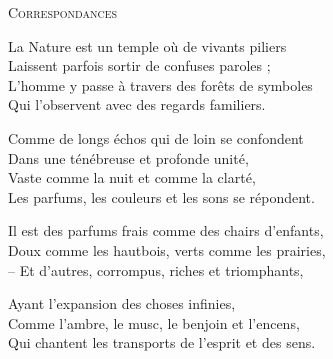\begin{fquote}
\vspace{-1em}
\begin{center}
\hspace{-.0\linewidth}\textsc{Correspondances}
\end{center}

\hspace{.12\linewidth}La Nature est un temple où de vivants piliers \\[-1.5em]

\hspace{.12\linewidth}Laissent parfois sortir de confuses paroles ;\\[-1.5em]

\hspace{.12\linewidth}L'homme y passe à travers des forêts de symboles \\[-1.5em]

\hspace{.12\linewidth}Qui l'observent avec des regards familiers. \bigskip

\hspace{.12\linewidth}Comme de longs échos qui de loin se confondent \\[-1.5em]

\hspace{.12\linewidth}Dans une ténébreuse et profonde unité, \\[-1.5em]

\hspace{.12\linewidth}Vaste comme la nuit et comme la clarté,\\[-1.5em]

\hspace{.12\linewidth}Les parfums, les couleurs et les sons se répondent. \bigskip

\hspace{.12\linewidth}Il est des parfums frais comme des chairs d'enfants, \\[-1.5em]

\hspace{.12\linewidth}Doux comme les hautbois, verts comme les prairies, \\[-1.5em]

\hspace{.12\linewidth}-- Et d'autres, corrompus, riches et triomphants, \bigskip

\hspace{.12\linewidth}Ayant l'expansion des choses infinies, \\[-1.5em]

\hspace{.12\linewidth}Comme l'ambre, le musc, le benjoin et l'encens, \\[-1.5em]

\hspace{.12\linewidth}Qui chantent les transports de l'esprit et des sens.
\end{fquote}